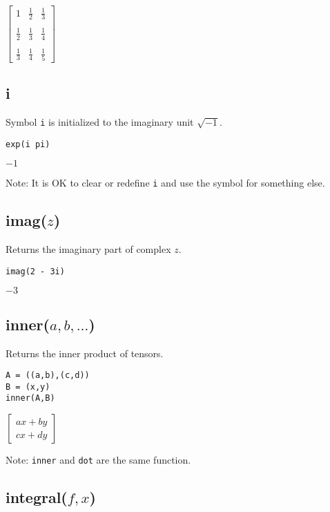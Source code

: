 \noindent
$\displaystyle
\begin{bmatrix}
1 & \tfrac{1}{2} & \tfrac{1}{3}\\ \\
\tfrac{1}{2} & \tfrac{1}{3} & \tfrac{1}{4}\\ \\
\tfrac{1}{3} & \tfrac{1}{4} & \tfrac{1}{5}
\end{bmatrix}
$

\subsection*{i}

Symbol {\tt i} is initialized to the imaginary unit $\sqrt{-1}$.

{\color{blue}
\begin{verbatim}
exp(i pi)
\end{verbatim}
}

\noindent
$-1$

\bigskip
\noindent
Note: It is OK to clear or redefine {\tt i} and use the symbol for something else.

\subsection*{imag($z$)}

Returns the imaginary part of complex $z$.

{\color{blue}
\begin{verbatim}
imag(2 - 3i)
\end{verbatim}
}

\noindent
$-3$

\subsection*{inner($a,b,\ldots$)}

Returns the inner product of tensors.

{\color{blue}
\begin{verbatim}
A = ((a,b),(c,d))
B = (x,y)
inner(A,B)
\end{verbatim}
}

\noindent
$\displaystyle
\begin{bmatrix}
ax+by\\
cx+dy
\end{bmatrix}
$

\bigskip
\noindent
Note: {\tt inner} and {\tt dot} are the same function.

\subsection*{integral($f,x$)}

